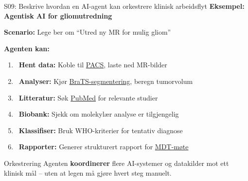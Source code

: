 \documentclass[aspectratio=169, 10pt]{beamer}
\begin{document}
\begin{frame}{S09: Beskrive hvordan en AI-agent kan orkestrere klinisk arbeidsflyt}
    \textbf{Eksempel: Agentisk AI for gliomutredning}
    
    \vspace{0.2cm}
    \textbf{Scenario:} Lege ber om ``Utred ny MR for mulig gliom''
    
    \vspace{0.2cm}
    \textbf{Agenten kan:}
    \begin{enumerate}
        \item \faSearch~\textbf{Hent data:} Koble til \href{https://en.wikipedia.org/wiki/Picture_archiving_and_communication_system}{PACS}, laste ned MR-bilder
        \item \faBrain~\textbf{Analyser:} Kjør \href{https://www.synapse.org/brats}{BraTS-segmentering}, beregn tumorvolum
        \item \faBookMedical~\textbf{Litteratur:} Søk \href{https://pubmed.ncbi.nlm.nih.gov/}{PubMed} for relevante studier
        \item \faDatabase~\textbf{Biobank:} Sjekk om molekylær analyse er tilgjengelig
        \item \faFile*~\textbf{Klassifiser:} Bruk WHO-kriterier for tentativ diagnose
        \item \faClipboard~\textbf{Rapporter:} Generer strukturert rapport for \href{https://en.wikipedia.org/wiki/Multidisciplinary_team}{MDT-møte}
    \end{enumerate}
    
    \vspace{0.1cm}
    {\small
    \begin{block}{Orkestrering}
        Agenten \textbf{koordinerer} flere AI-systemer og datakilder mot ett klinisk mål -- uten at legen må gjøre hvert steg manuelt.
    \end{block}
    }
\end{frame}
\end{document}

